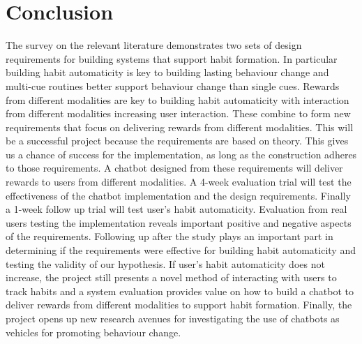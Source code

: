 
\newpage
\section{Conclusion}

The survey on the relevant literature demonstrates two sets of design requirements for building systems that support habit formation.
In particular building habit automaticity is key to building lasting behaviour change and multi-cue routines better support behaviour change than single cues.
Rewards from different modalities are key to building habit automaticity with interaction from different modalities increasing user interaction.
These combine to form new requirements that focus on delivering rewards from different modalities.\newline
\newline
This will be a successful project because the requirements are based on theory.
This gives us a chance of success for the implementation, as long as the construction adheres to those requirements.\newline
\newline
A chatbot designed from these requirements will deliver rewards to users from different modalities.
A 4-week evaluation trial will test the effectiveness of the chatbot implementation and the design requirements.
Finally a 1-week follow up trial will test user's habit automaticity.\newline
\newline
Evaluation from real users testing the implementation reveals important positive and negative aspects of the requirements.
Following up after the study plays an important part in determining if the requirements were effective for building habit automaticity and testing the validity of our hypothesis.
If user's habit automaticity does not increase, the project still presents a novel method of interacting with users to track habits and a system evaluation provides value
on how to build a chatbot to deliver rewards from different modalities to support habit formation.
Finally, the project opens up new research avenues for investigating the use of chatbots as vehicles for promoting behaviour change.
